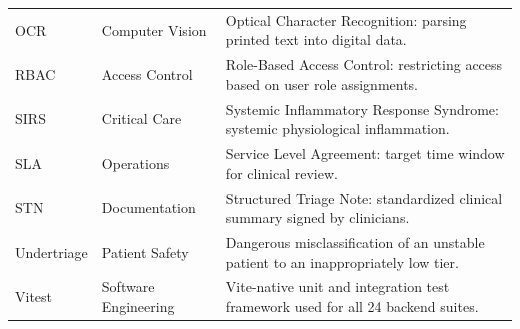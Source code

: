 \documentclass[11pt,a4paper,oneside]{report}
\begin{document}
\begin{longtable}{lp{3.0cm}p{7.4cm}}
  OCR & Computer Vision & Optical Character Recognition: parsing printed text into digital data. \\
  RBAC & Access Control & Role-Based Access Control: restricting access based on user role assignments. \\
  SIRS & Critical Care & Systemic Inflammatory Response Syndrome: systemic physiological inflammation. \\
  SLA & Operations & Service Level Agreement: target time window for clinical review. \\
  STN & Documentation & Structured Triage Note: standardized clinical summary signed by clinicians. \\
  Undertriage & Patient Safety & Dangerous misclassification of an unstable patient to an inappropriately low tier. \\
  Vitest & Software Engineering & Vite-native unit and integration test framework used for all 24 backend suites. \\
\end{longtable}
\end{document}
